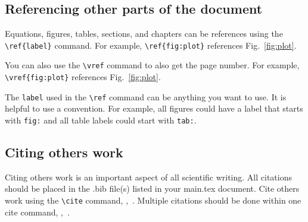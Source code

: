 \subsection{Referencing other parts of the document}\label{Sect:ref}
Equations, figures, tables, sections, and chapters can be references using the \verb|\ref{label}| command.  For example, \verb|\ref{fig:plot}| references Fig.~\ref{fig:plot}.  

You can also use the \verb|\vref| command to also get the page number.  For example, \verb|\vref{fig:plot}| references Fig.~\vref{fig:plot}.

The \verb|label| used in the \verb|\ref| command can be anything you want to use. It is helpful to use a convention.  For example, all figures could have a label that starts with \verb|fig:| and all table labels could start with \verb|tab:|.

\subsection{Citing others work}\label{Sect:cite}
Citing others work is an important aspect of all scientific writing.  All citations should be placed in the .bib file(s) listed in your main.tex document.  Cite others work using the \verb|\cite| command, \eg,~\cite{owkes_mesh-decoupled_2015}.  Multiple citations should be done within one cite command, \eg,~\cite{desjardins_direct_2013,owkes_discontinuous_2013,owkes_computational_2014}.  
